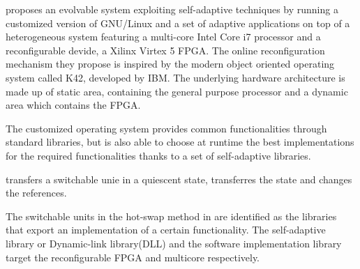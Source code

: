 
\cite{evolvable} proposes an evolvable system exploiting self-adaptive techniques by running a customized version of GNU/Linux and a set of adaptive applications on top of a heterogeneous system featuring a multi-core Intel Core i7 processor and a reconfigurable devide, a Xilinx Virtex 5 FPGA. The online reconfiguration mechanism they propose is inspired by the modern object oriented operating system called K42, developed by IBM. The underlying hardware architecture is made up of static area, containing the general purpose processor and a dynamic area which contains the FPGA. 

The customized operating system provides common functionalities through standard libraries, but is also able to choose at runtime the best implementations for the required functionalities thanks to a set of self-adaptive libraries. 

transfers a switchable unie in a quiescent state, transferres the state and changes the references. 

The switchable units in the hot-swap method in \cite{evolvable} are identified as the libraries that export an implementation of a certain functionality. The self-adaptive library or Dynamic-link library(DLL) and the software implementation library target the reconfigurable FPGA and multicore respectively. 
